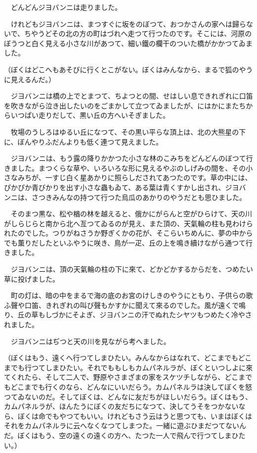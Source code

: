 \documentclass[tate,paper=b6j,jafontsize=9pt]{jlreq}
\begin{document}
　どんどんジヨバンニは走りました。

　けれどもジヨバンニは、まつすぐに坂をのぼつて、おつかさんの家へは歸らないで、ちやうどその北の方の町はづれへ走つて行つたのです。そこには、河原のぼうつと白く見える小さな川があつて、細い鐵の欄干のついた橋がかかつてゐました。

（ぼくはどこへもあそびに行くとこがない。ぼくはみんなから、まるで狐のやうに見えるんだ。）

　ジヨバンニは橋の上でとまつて、ちよつとの間、せはしい息できれぎれに口笛を吹きながら泣き出したいのをごまかして立つてゐましたが、にはかにまたちからいつぱい走りだして、黒い丘の方へいそぎました。



　牧場のうしろはゆるい丘になつて、その黒い平らな頂上は、北の大熊星の下に、ぼんやりふだんよりも低く連つて見えました。

　ジヨバンニは、もう露の降りかかつた小さな林のこみちをどんどんのぼつて行きました。まつくらな草や、いろいろな形に見えるやぶのしげみの間を、その小さなみちが、一すじ白く星あかりに照らしだされてあつたのです。草の中には、ぴかぴか青びかりを出す小さな蟲もゐて、ある葉は青くすかし出され、ジヨバンニは、さつきみんなの持つて行つた烏瓜のあかりのやうだとも思ひました。

　そのまつ黒な、松や楢の林を越えると、俄かにがらんと空がひらけて、天の川がしらじらと南から北へ亙つてゐるのが見え、また頂の、天氣輪の柱も見わけられたのでした。つりがねさうか野ぎくかの花が、そこらいちめんに、夢の中からでも薫りだしたといふやうに咲き、鳥が一疋、丘の上を鳴き續けながら通つて行きました。

　ジヨバンニは、頂の天氣輪の柱の下に來て、どかどかするからだを、つめたい草に投げました。

　町の灯は、暗の中をまるで海の底のお宮のけしきのやうにともり、子供らの歌ふ聲や口笛、きれぎれの叫び聲もかすかに聞えて來るのでした。風が遠くで鳴り、丘の草もしづかにそよぎ、ジヨバンニの汗でぬれたシヤツもつめたく冷やされました。

　ジヨバンニはぢつと天の川を見ながら考へました。

（ぼくはもう、遠くへ行つてしまひたい。みんなからはなれて、どこまでもどこまでも行つてしまひたい。それでももしもカムパネルラが、ぼくといつしよに來てくれたら、そして二人で、野原やさまざまの家をスケツチしながら、どこまでもどこまでも行くのなら、どんなにいいだらう。カムパネルラは決してぼくを怒つてゐないのだ。そしてぼくは、どんなに友だちがほしいだらう。ぼくはもう、カムパネルラが、ほんたうにぼくの友だちになつて、決してうそをつかないなら、ぼくは命でもやつてもいい。けれどもさう云はうと思つても、いまはぼくはそれをカムパネルラに云へなくなつてしまつた。一緒に遊ぶひまだつてないんだ。ぼくはもう、空の遠くの遠くの方へ、たつた一人で飛んで行つてしまひたい。）
\end{document}
